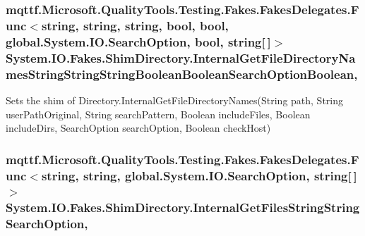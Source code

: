 \hypertarget{class_system_1_1_i_o_1_1_fakes_1_1_shim_directory_a445c777c0e38d9d717ab78e41c49a94e}{
\subsubsection[{Internal\-Get\-File\-Directory\-Names\-String\-String\-String\-Boolean\-Boolean\-Search\-Option\-Boolean}]{\setlength{\rightskip}{0pt plus 5cm}mqttf.\-Microsoft.\-Quality\-Tools.\-Testing.\-Fakes.\-Fakes\-Delegates.\-Func$<$string, string, string, bool, bool, global.\-System.\-I\-O.\-Search\-Option, bool, string\mbox{[}$\,$\mbox{]}$>$ System.\-I\-O.\-Fakes.\-Shim\-Directory.\-Internal\-Get\-File\-Directory\-Names\-String\-String\-String\-Boolean\-Boolean\-Search\-Option\-Boolean\hspace{0.3cm}{\ttfamily [static]}, {\ttfamily [set]}}}\label{class_system_1_1_i_o_1_1_fakes_1_1_shim_directory_a445c777c0e38d9d717ab78e41c49a94e}


Sets the shim of Directory.\-Internal\-Get\-File\-Directory\-Names(\-String path, String user\-Path\-Original, String search\-Pattern, Boolean include\-Files, Boolean include\-Dirs, Search\-Option search\-Option, Boolean check\-Host)

\hypertarget{class_system_1_1_i_o_1_1_fakes_1_1_shim_directory_acadb72968d0b02db0a4c7cca87065483}{
\subsubsection[{Internal\-Get\-Files\-String\-String\-Search\-Option}]{\setlength{\rightskip}{0pt plus 5cm}mqttf.\-Microsoft.\-Quality\-Tools.\-Testing.\-Fakes.\-Fakes\-Delegates.\-Func$<$string, string, global.\-System.\-I\-O.\-Search\-Option, string\mbox{[}$\,$\mbox{]}$>$ System.\-I\-O.\-Fakes.\-Shim\-Directory.\-Internal\-Get\-Files\-String\-String\-Search\-Option\hspace{0.3cm}{\ttfamily [static]}, {\ttfamily [set]}}}\label{class_system_1_1_i_o_1_1_fakes_1_1_shim_directory_acadb72968d0b02db0a4c7cca87065483}


